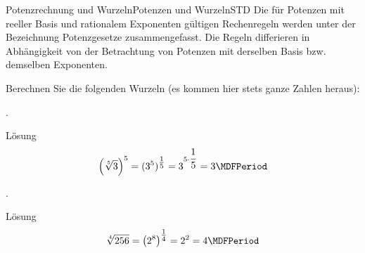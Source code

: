 \begin{MXContent}{Potenzrechnung und Wurzeln}{Potenzen und Wurzeln}{STD}
Die für Potenzen mit reeller Basis und rationalem Exponenten gültigen Rechenregeln werden unter der Bezeichnung Potenzgesetze zusammengefasst.
Die Regeln differieren in Abhängigkeit von der Betrachtung von Potenzen mit derselben Basis bzw. demselben Exponenten.

\begin{MExercise}
Berechnen Sie die folgenden Wurzeln (es kommen hier stets ganze Zahlen heraus):
\begin{MExerciseItems}
\item{.\\\begin{MHint}{Lösung} $$\left(\sqrt[5]{3}\right)^5=(3^5)^{\Mtfrac15}=3^{5\cdot \Mdfrac15}=3 \MDFPeriod$$\end{MHint}}
\item{.\\\begin{MHint}{Lösung} $$\sqrt[4]{256}=\left({2^8}\right)^{\Mtfrac14}=2^2=4 \MDFPeriod$$\end{MHint}}
\end{MExerciseItems}
\end{MExercise}

\end{MXContent}

